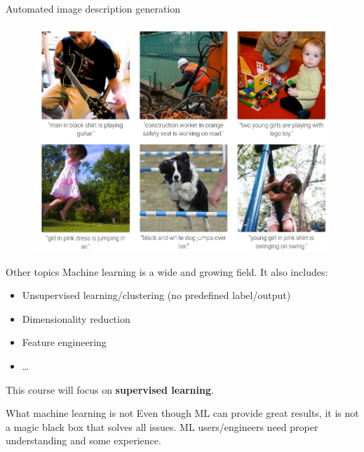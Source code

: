 \documentclass{beamer}
\begin{document}
\begin{frame}{Automated image description generation}

\begin{figure}
\centering
\includegraphics[width=\textwidth]{images/generated_descriptions.jpg}
\end{figure}
\end{frame}

\begin{frame}{Other topics}
\vfill
Machine learning is a wide and growing field. It also includes:	
\pause 
\vfill
\begin{itemize}
	\item Unsupervised learning/clustering (no predefined label/output)
\pause 
\vfill
	\item Dimensionality reduction
\pause 
\vfill
	\item Feature engineering
\pause 
\vfill
	\item \ldots
\end{itemize}
\vfill
This course will focus on \textbf{supervised learning}.
\vfill
\end{frame}

\begin{frame}{What machine learning is not}
Even though ML can provide great results, it is not a magic black box that solves all issues.
\vfill
ML users/engineers need proper understanding and some experience.
\end{frame}
\end{document}
